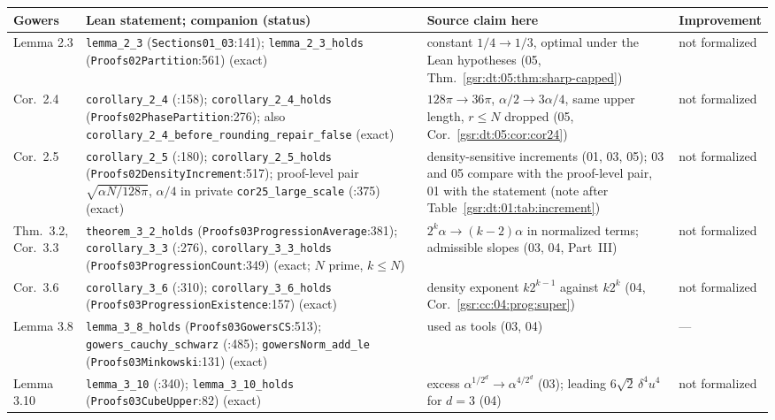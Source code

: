 \documentclass[11pt,letterpaper]{article}
\numberwithin{equation}{section}
\theoremstyle{definition}
\theoremstyle{remark}
\newcommand{\1}{\mathbf 1}
\newcommand{\file}[1]{\nolinkurl{#1}}
\begin{document}
\begingroup\small
\renewcommand{\theHtable}{crosswalk.\arabic{table}}
\begin{longtable}{@{}>{\raggedright\arraybackslash}p{} >{\raggedright\arraybackslash}p{} >{\raggedright\arraybackslash}p{} >{\raggedright\arraybackslash}p{}@{}}
\toprule
Gowers & Lean statement; companion (status) & Source claim here & Improvement\\
\midrule
\endhead
Lemma 2.3 & \file{lemma_2_3} (\file{Sections01\_03}:141); \file{lemma_2_3_holds} (\file{Proofs02Partition}:561) (exact) & constant $1/4\to1/3$, optimal under the Lean hypotheses (05, Thm.~\ref{gsr:dt:05:thm:sharp-capped}) & not formalized\\
Cor.~2.4 & \file{corollary_2_4} (:158); \file{corollary_2_4_holds} (\file{Proofs02PhasePartition}:276); also \file{corollary_2_4_before_rounding_repair_false} (exact) & $128\pi\to36\pi$, $\alpha/2\to3\alpha/4$, same upper length, $r\le N$ dropped (05, Cor.~\ref{gsr:dt:05:cor:cor24}) & not formalized\\
Cor.~2.5 & \file{corollary_2_5} (:180); \file{corollary_2_5_holds} (\file{Proofs02DensityIncrement}:517); proof-level pair $\sqrt{\alpha N/128\pi}$, $\alpha/4$ in private \file{cor25_large_scale} (:375) (exact) & density-sensitive increments (01, 03, 05); 03 and 05 compare with the proof-level pair, 01 with the statement (note after Table~\ref{gsr:dt:01:tab:increment}) & not formalized\\
Thm.~3.2, Cor.~3.3 & \file{theorem_3_2_holds} (\file{Proofs03ProgressionAverage}:381); \file{corollary_3_3} (:276), \file{corollary_3_3_holds} (\file{Proofs03ProgressionCount}:349) (exact; $N$ prime, $k\le N$) & $2^k\alpha\to(k-2)\alpha$ in normalized terms; admissible slopes (03, 04, Part~III) & not formalized\\
Cor.~3.6 & \file{corollary_3_6} (:310); \file{corollary_3_6_holds} (\file{Proofs03ProgressionExistence}:157) (exact) & density exponent $k2^{k-1}$ against $k2^k$ (04, Cor.~\ref{gsr:cc:04:prog:super}) & not formalized\\
Lemma 3.8 & \file{lemma_3_8_holds} (\file{Proofs03GowersCS}:513); \file{gowers_cauchy_schwarz} (:485); \file{gowersNorm_add_le} (\file{Proofs03Minkowski}:131) (exact) & used as tools (03, 04) & ---\\
Lemma 3.10 & \file{lemma_3_10} (:340); \file{lemma_3_10_holds} (\file{Proofs03CubeUpper}:82) (exact) & excess $\alpha^{1/2^d}\to\alpha^{4/2^d}$ (03); leading $6\sqrt2\,\delta^4u^4$ for $d=3$ (04) & not formalized\\

\end{longtable}
\end{document}
